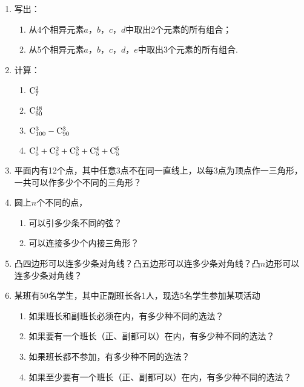 \begin{ex}
\begin{enumerate}
    \item 写出：
    \begin{enumerate}[(1)]
    \item 从4个相异元素$a$，$b$，$c$，$d$中取出2个元素的所有组合；
    \item 从5个相异元素$a$，$b$，$c$，$d$，$e$中取出3个元素的所有组合.
    \end{enumerate}

    \item 计算：
\begin{multicols}{2}
\begin{enumerate}[(1)]
    \item  ${\rm C}^{2}_{7}$
    \item ${\rm C}^{48}_{50}$
    \item ${\rm C}^{3}_{100}-{\rm C}^{3}_{90}$
    \item ${\rm C}^{1}_{5}+{\rm C}^{2}_{5}+{\rm C}^{3}_{5}+{\rm C}^{4}_{5}+{\rm C}^{5}_{5}$
\end{enumerate}
\end{multicols}
    
\item   平面内有12个点，其中任意3点不在同一直线上，以每3点为顶点作一三角形，一共可以作多少个不同的三角形？
\item 圆上$n$个不同的点，
\begin{enumerate}[(1)]
\item 可以引多少条不同的弦？
\item 可以连接多少个内接三角形？
\end{enumerate}

\item 凸四边形可以连多少条对角线？凸五边形可以连多少条对角线？凸$n$边形可以连多少条对角线？
\item 某班有50名学生，其中正副班长各1人，现选5名学生参加某项活动
\begin{enumerate}[(1)]
\item 如果班长和副班长必须在内，有多少种不同的选法？
\item 如果要有一个班长（正、副都可以）在内，有多少种不同的选法？
\item 如果班长都不参加，有多少种不同的选法？
\item 如果至少要有一个班长（正、副都可以）在内，有多少种不同的选法？
\end{enumerate}
\end{enumerate}
\end{ex}

